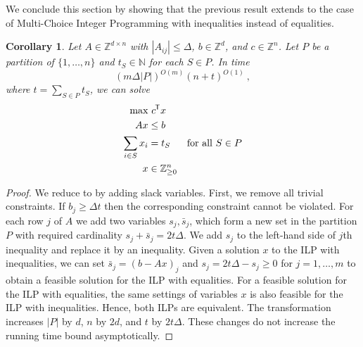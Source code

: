 \documentclass{article}
\newcommand*{\T}{^{\mkern-1.5mu\mathsf{T}}}
\newcommand{\N}{\mathbb{N}}
\newcommand{\Z}{\mathbb{Z}}
\newcommand{\ZZ}{\Z_{\ge 0}}
\newtheorem{corollary}[theorem]{Corollary}
\begin{document}
We conclude this section by showing that the previous result extends to the case of Multi-Choice Integer
Programming with inequalities instead of equalities.
\begin{corollary}\label{cor:ilp2}
	Let $A\in \Z^{d\times n}$ with $|A_{ij}| \le \Delta$, $b\in \Z^d$, and $c\in\Z^n$.
	Let $P$ be a partition of $\{1,\dotsc,n\}$ and $t_S\in\N$ for each $S\in P$.
	In time
	\begin{equation*}
		(m \Delta |P|)^{O(m)} (n + t)^{O(1)} \ ,
	\end{equation*}
	where $t = \sum_{S\in P} t_S$, we can solve
	\begin{align*}
		\max &\ c\T x \\
		A x &\le b \\
		\sum_{i\in S} x_i &= t_S &\text{\rm for all } S\in P \\
		x &\in \ZZ^n 
	\end{align*}
\end{corollary}
\begin{proof}
We reduce to  by adding slack variables.
First, we remove all trivial constraints. If $b_j \ge \Delta t$ then the corresponding constraint cannot be
violated. 
For each row $j$ of $A$ we add two variables $s_j, \bar s_j$, which
form a new set in the partition $P$ with required cardinality $s_j + \bar s_j = 2 t\Delta$.
We add $s_j$ to the left-hand side of $j$th inequality and replace it by an inequality.
Given a solution $x$ to the ILP with inequalities, we can set $\bar s_j = (b - Ax)_j$
and $s_j = 2t\Delta - s_j \ge 0$ for $j=1,\dotsc,m$ to obtain a feasible solution for the ILP with
equalities. For a feasible solution for the ILP with equalities, the same settings of variables $x$
is also feasible for the ILP with inequalities. Hence, both ILPs are equivalent.
The transformation increases $|P|$ by $d$, $n$ by $2d$, and $t$ by $2t\Delta$.
These changes do not increase the running time bound asymptotically.
\end{proof}
\end{document}
